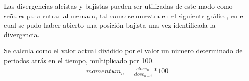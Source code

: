 Las divergencias alcistas y bajistas pueden ser utilizadas de este modo como señales para entrar al mercado, tal como se muestra en el siguiente gráfico, en el cual se pudo haber abierto una posición bajista una vez identificada la divergencia.

Se calcula como el valor actual dividido por el valor un número determinado de periodos atrás en el tiempo, multiplicado por 100.
\begin{gather*}
\label{eqn:MOM}
momentum_n = \frac{close_n}{close_{n-t}} * 100 \\
\end{gather*}


\pagebreak







